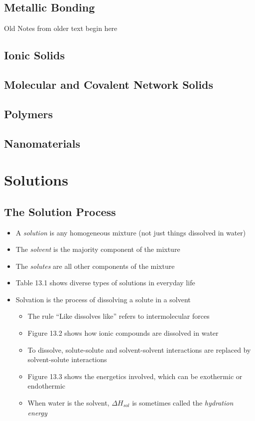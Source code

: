 \documentclass[12pt, openany, letterpaper]{memoir}
\begin{document}
\section{Metallic Bonding}

{\HUGE Old Notes from older text begin here}

\section{Ionic Solids}

\section{Molecular and Covalent Network Solids}

\section{Polymers}

\section{Nanomaterials}

\chapter{Solutions}
\section{The Solution Process}
\begin{itemize}
	\item A \emph{solution} is any homogeneous mixture (not just things dissolved in water)
	\item The \emph{solvent} is the majority component of the mixture
	\item The \emph{solutes} are all other components of the mixture
	\item Table 13.1 shows diverse types of solutions in everyday life
	\item Solvation is the process of dissolving a solute in a solvent
	\begin{itemize}
		\item The rule ``Like dissolves like'' refers to intermolecular forces
		\item Figure 13.2 shows how ionic compounds are dissolved in water
		\item To dissolve, solute-solute and solvent-solvent interactions are replaced by solvent-solute interactions
		\item Figure 13.3 shows the energetics involved, which can be exothermic or endothermic
		\item When water is the solvent, $\Delta H_{sol}$ is sometimes called the \emph{hydration energy}		
	\end{itemize}
\end{itemize}
\end{document}
